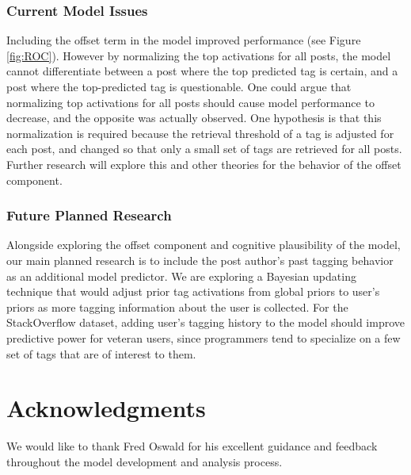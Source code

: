\documentclass[10pt,letterpaper]{article}
\begin{document}
\subsubsection{Current Model Issues}

Including the offset term in the model improved performance (see Figure \ref{fig:ROC}).
However by normalizing the top activations for all posts, the model cannot differentiate between a post where the top predicted tag is certain, and a post where the top-predicted tag is questionable.
One could argue that normalizing top activations for all posts should cause model performance to decrease, and the opposite was actually observed.
One hypothesis is that this normalization is required because the retrieval threshold of a tag is adjusted for each post, and changed so that only a small set of tags are retrieved for all posts.
Further research will explore this and other theories for the behavior of the offset component.

\subsubsection{Future Planned Research}

Alongside exploring the offset component and cognitive plausibility of the model, our main planned research is to include the post author's past tagging behavior as an additional model predictor.
We are exploring a Bayesian updating technique that would adjust prior tag activations from global priors to user's priors as more tagging information about the user is collected.
For the StackOverflow dataset, adding user's tagging history to the model should improve predictive power for veteran users,
since programmers tend to specialize on a few set of tags that are of interest to them.

\section{Acknowledgments}

We would like to thank Fred Oswald for his excellent guidance and feedback throughout the model development and analysis process.


\setlength{\bibleftmargin}{.125in}
\setlength{\bibindent}{-\bibleftmargin}

\end{document}
